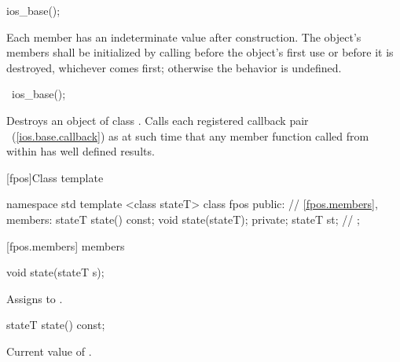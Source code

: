 %
\begin{itemdecl}
ios_base();
\end{itemdecl}

\begin{itemdescr}
\pnum
\effects
Each
member has an indeterminate value after construction.
The object's members shall be initialized by calling
before the object's first use or before it is destroyed, whichever comes first; otherwise
the behavior is undefined.
\end{itemdescr}

%
\begin{itemdecl}
~ios_base();
\end{itemdecl}

\begin{itemdescr}
\pnum
\effects
Destroys an object of class
.
Calls each registered callback pair
~(\ref{ios.base.callback}) as
at such time that any
member function called from within
has well defined results.
\end{itemdescr}

[fpos]{Class template }

%
\begin{codeblock}
namespace std {
  template <class stateT> class fpos {
  public:
    // \ref{fpos.members}, members:
    stateT state() const;
    void state(stateT);
  private;
    stateT st; // \expos
  };
}
\end{codeblock}

[fpos.members]{ members}

%
\begin{itemdecl}
void state(stateT s);
\end{itemdecl}

\begin{itemdescr}
\pnum
\effects
Assigns  to .
\end{itemdescr}

%
\begin{itemdecl}
stateT state() const;
\end{itemdecl}

\begin{itemdescr}
\pnum
\returns
Current value of .
\end{itemdescr}

